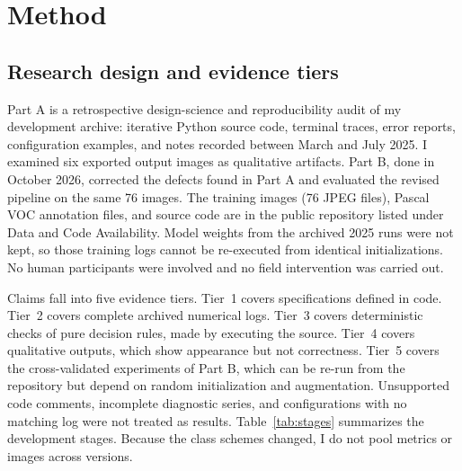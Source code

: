 \documentclass[11pt]{article}
\begin{document}
\section{Method}
\subsection{Research design and evidence tiers}
Part A is a retrospective design-science and reproducibility audit of my development archive: iterative Python source code, terminal traces, error reports, configuration examples, and notes recorded between March and July 2025. I examined six exported output images as qualitative artifacts. Part B, done in October 2026, corrected the defects found in Part A and evaluated the revised pipeline on the same 76 images. The training images (76 JPEG files), Pascal VOC annotation files, and source code are in the public repository listed under Data and Code Availability. Model weights from the archived 2025 runs were not kept, so those training logs cannot be re-executed from identical initializations. No human participants were involved and no field intervention was carried out.

Claims fall into five evidence tiers. Tier~1 covers specifications defined in code. Tier~2 covers complete archived numerical logs. Tier~3 covers deterministic checks of pure decision rules, made by executing the source. Tier~4 covers qualitative outputs, which show appearance but not correctness. Tier~5 covers the cross-validated experiments of Part B, which can be re-run from the repository but depend on random initialization and augmentation. Unsupported code comments, incomplete diagnostic series, and configurations with no matching log were not treated as results. Table~\ref{tab:stages} summarizes the development stages. Because the class schemes changed, I do not pool metrics or images across versions.
\end{document}
